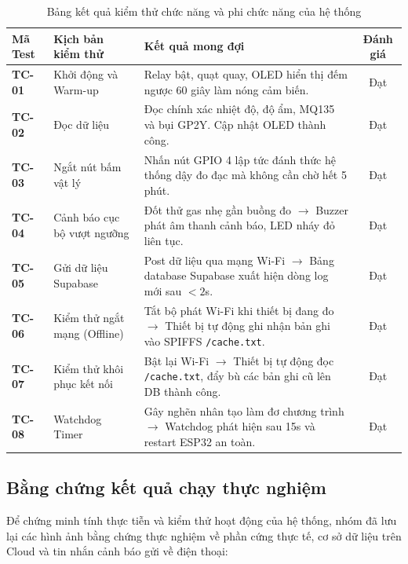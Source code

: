 \begin{table}[H]
\centering
\caption{Bảng kết quả kiểm thử chức năng và phi chức năng của hệ thống}
\label{tab:testcases}
\begin{small}
\begin{tabular}{lp{5.5cm}p{6.0cm}c}
\toprule
\textbf{Mã Test} & \textbf{Kịch bản kiểm thử} & \textbf{Kết quả mong đợi} & \textbf{Đánh giá} \\
\midrule
\textbf{TC-01} & Khởi động và Warm-up & Relay bật, quạt quay, OLED hiển thị đếm ngược 60 giây làm nóng cảm biến. & Đạt \\
\midrule
\textbf{TC-02} & Đọc dữ liệu & Đọc chính xác nhiệt độ, độ ẩm, MQ135 và bụi GP2Y. Cập nhật OLED thành công. & Đạt \\
\midrule
\textbf{TC-03} & Ngắt nút bấm vật lý & Nhấn nút GPIO 4 lập tức đánh thức hệ thống dậy đo đạc mà không cần chờ hết 5 phút. & Đạt \\
\midrule
\textbf{TC-04} & Cảnh báo cục bộ vượt ngưỡng & Đốt thử gas nhẹ gần buồng đo $\rightarrow$ Buzzer phát âm thanh cảnh báo, LED nháy đỏ liên tục. & Đạt \\
\midrule
\textbf{TC-05} & Gửi dữ liệu Supabase & Post dữ liệu qua mạng Wi-Fi $\rightarrow$ Bảng database Supabase xuất hiện dòng log mới sau $< 2$s. & Đạt \\
\midrule
\textbf{TC-06} & Kiểm thử ngắt mạng (Offline) & Tắt bộ phát Wi-Fi khi thiết bị đang đo $\rightarrow$ Thiết bị tự động ghi nhận bản ghi vào SPIFFS \texttt{/cache.txt}. & Đạt \\
\midrule
\textbf{TC-07} & Kiểm thử khôi phục kết nối & Bật lại Wi-Fi $\rightarrow$ Thiết bị tự động đọc \texttt{/cache.txt}, đẩy bù các bản ghi cũ lên DB thành công. & Đạt \\
\midrule
\textbf{TC-08} & Watchdog Timer & Gây nghẽn nhân tạo làm đơ chương trình $\rightarrow$ Watchdog phát hiện sau 15s và restart ESP32 an toàn. & Đạt \\
\bottomrule
\end{tabular}
\end{small}
\end{table}

\subsection{Bằng chứng kết quả chạy thực nghiệm}
Để chứng minh tính thực tiễn và kiểm thử hoạt động của hệ thống, nhóm đã lưu lại các hình ảnh bằng chứng thực nghiệm về phần cứng thực tế, cơ sở dữ liệu trên Cloud và tin nhắn cảnh báo gửi về điện thoại:

